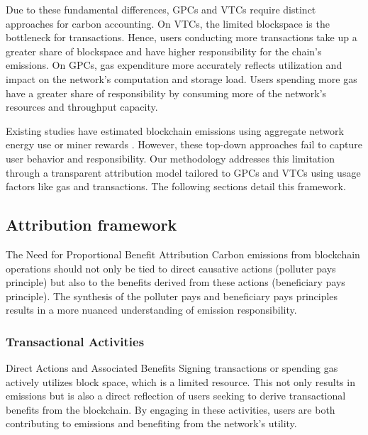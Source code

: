 \documentclass[11pt]{report}
\begin{document}
Due to these fundamental differences, GPCs and VTCs require distinct approaches for carbon accounting. On VTCs, the limited blockspace is the bottleneck for transactions. Hence, users conducting more transactions take up a greater share of blockspace and have higher responsibility for the chain's emissions. On GPCs, gas expenditure more accurately reflects utilization and impact on the network's computation and storage load. Users spending more gas have a greater share of responsibility by consuming more of the network's resources and throughput capacity.

Existing studies have estimated blockchain emissions using aggregate network energy use or miner rewards \cite{devriesCryptocurrenciesRoadSustainability2022,devriesRevisitingBitcoinCarbon2022,neumuellerCambridgeBitcoinElectricity2021,mcdonaldEthereumEmissionsBottomup2022}. However, these top-down approaches fail to capture user behavior and responsibility. Our methodology addresses this limitation through a transparent attribution model tailored to GPCs and VTCs using usage factors like gas and transactions. The following sections detail this framework.

\subsection{Attribution framework}
The Need for Proportional Benefit Attribution
Carbon emissions from blockchain operations should not only be tied to direct causative actions (polluter pays principle) but also to the benefits derived from these actions (beneficiary pays principle). The synthesis of the polluter pays and beneficiary pays principles results in a more nuanced understanding of emission responsibility.

\subsubsection*{Transactional Activities}

Direct Actions and Associated Benefits
Signing transactions or spending gas actively utilizes block space, which is a limited resource. This not only results in emissions but is also a direct reflection of users seeking to derive transactional benefits from the blockchain. By engaging in these activities, users are both contributing to emissions and benefiting from the network's utility.
\end{document}

